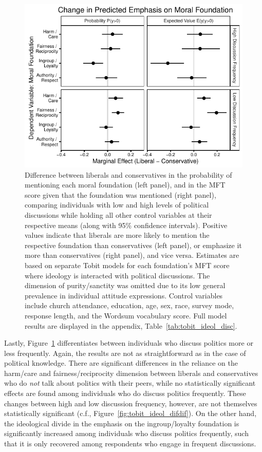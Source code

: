 \documentclass[12pt]{article}
\begin{document}
\begin{figure}[ht]\centering
\includegraphics{../calc/fig/tobit_ideol_disc.pdf}
\caption{Difference between liberals and conservatives in the probability of mentioning each moral foundation (left panel), and in the MFT score given that the foundation was mentioned (right panel), comparing individuals with low and high levels of political discussions while holding all other control variables at their respective means (along with 95\% confidence intervals). Positive values indicate that liberals are more likely to mention the respective foundation than conservatives (left panel), or emphasize it more than conservatives (right panel), and vice versa. Estimates are based on separate Tobit models for each foundation's MFT score where ideology is interacted with political discussions. The dimension of purity/sanctity was omitted due to its low general prevalence in individual attitude expressions. Control variables include church attendance, education, age, sex, race, survey mode, response length, and the Wordsum vocabulary score. Full model results are displayed in the appendix, Table~\ref{tab:tobit_ideol_disc}.}\label{fig:tobit_ideol_disc}
\end{figure}

Lastly, Figure~\ref{fig:tobit_ideol_disc} differentiates between individuals who discuss politics more or less frequently. Again, the results are not as straightforward as in the case of political knowledge. There are significant differences in the reliance on the harm/care and fairness/reciprocity dimension between liberals and conservatives who do \textit{not} talk about politics with their peers, while no statistically significant effects are found among individuals who do discuss politics frequently. These changes between high and low discussion frequency, however, are not themselves statistically significant (c.f., Figure~\ref{fig:tobit_ideol_difdif}). On the other hand, the ideological divide in the emphasis on the ingroup/loyalty foundation is significantly increased among individuals who discuss politics frequently, such that it is only recovered among respondents who engage in frequent discussions.
\end{document}
